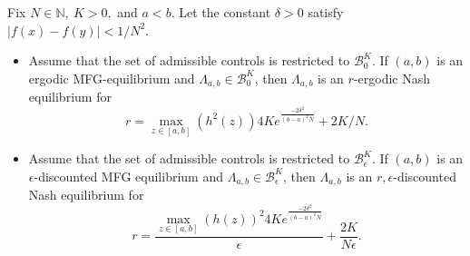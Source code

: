\documentclass[10pt,a4paper]{amsart}
\begin{document}
\begin{theorem}
    Fix $N \in \mathbb{N}, \ K>0,  $ and $a < b$. Let the constant $\delta>0$ satisfy $\vert f(x)-f(y) \vert <1/N^2 $.
 \begin{itemize}
     \item[\rm{(i)}] Assume that the set of admissible controls is restricted to $\mathcal{B}^K_0$. If $(a,b)$ is an ergodic MFG-equilibrium and $\Lambda_{a,b} \in \mathcal{B}^K_0$, then $\Lambda_{a,b}$ is an $r$-ergodic Nash equilibrium for 
     $$r=\max_{z \in [a,b]}(h^2(z)) 4K e^{\frac{-2 \delta^2}{(b-a)^2N}}+2K/N .$$
     \item[\rm{(ii)}] Assume that the set of admissible controls is restricted to $\mathcal{B}^K_\epsilon$. If $(a,b)$ is an $\epsilon$-discounted MFG equilibrium and $\Lambda_{a,b} \in \mathcal{B}^K_{\epsilon}$, then $\Lambda_{a,b}$ is an $r,\epsilon$-discounted Nash equilibrium for
          $$r=\frac{\max_{z \in [a,b]}(h(z))^2 4Ke^{\frac{-2 \delta^2}{(b-a)^2N}}}{\epsilon}+\frac{2K}{N\epsilon} . $$

 \end{itemize}   
\end{theorem}
\end{document}
